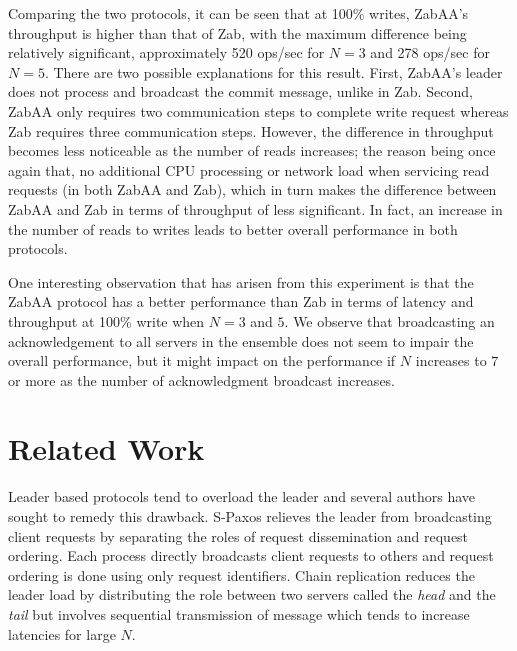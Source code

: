 \documentclass[a4paper,UKenglish]{oasics-v2016}
\begin{document}
Comparing the two protocols, it can be seen that at 100\% writes, ZabAA's throughput is higher than that of Zab, with the maximum difference being relatively significant, approximately 520 ops/sec for $N=3$ and 278 ops/sec for $N=5$. There are two possible explanations for this result. First, ZabAA's leader does not process and broadcast the commit message, unlike in Zab. Second, ZabAA only requires two communication steps to complete write request whereas Zab requires three communication steps. However, the difference in throughput becomes less noticeable as the number of reads increases; the reason being once again that, no additional CPU processing or network load when servicing read requests (in both ZabAA and Zab), which in turn makes the difference between ZabAA and Zab in terms of throughput of less significant. In fact, an increase in the number of reads to writes leads to better overall performance in both protocols. 

One interesting observation that has arisen from this experiment is that the ZabAA protocol has a better performance than Zab in terms of latency and throughput at 100\% write when $N=3$ and $5$. We observe that broadcasting an acknowledgement to all servers in the ensemble does not seem to impair the overall performance, but it might  impact on the performance if $N$ increases to $7$ or more as the number of acknowledgment broadcast increases. 



\section{Related Work} \label{Related Works}


Leader based protocols tend to overload the leader %
and several authors	\cite{r5,r9,r39,r37} have sought to remedy this drawback.
S-Paxos \cite{r5} relieves the leader from broadcasting client requests by
separating the roles of request dissemination and request ordering.
Each process directly broadcasts client requests to others %
and request ordering is done %
using only request identifiers.
Chain replication \cite{r39} reduces the leader load by distributing the role between two servers called the \textit{head} and the \textit{tail} %
but involves sequential transmission of message which tends to increase latencies for large $N$.
\end{document}

